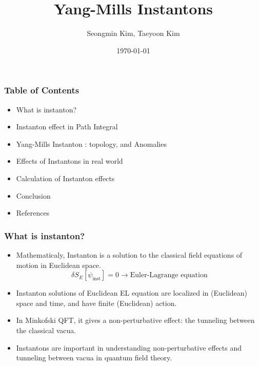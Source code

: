 \documentclass[10pt]{beamer}
\title{Yang-Mills Instantons}
\author{Seongmin Kim, Taeyoon Kim}
\institute{SNU}
\date{\today}
\begin{document}
\frame{\titlepage}

\begin{frame}
\frametitle{Table of Contents}
\begin{itemize}
\item What is instanton?
\item Instanton effect in Path Integral
\item Yang-Mills Instanton : topology, and Anomalies
\item Effects of Instantons in real world
\item Calculation of Instanton effects
\item Conclusion
\item References
\end{itemize}
\end{frame}

\begin{frame}
\frametitle{What is instanton?}
\begin{itemize}
\item Mathematicaly, Instanton is a solution to the classical field equations of motion in Euclidean space.
\begin{equation}
    \delta S_E [\psi_{\text{inst}}] = 0 \rightarrow \text{Euler-Lagrange equation}
\end{equation}
\item Instanton solutions of Euclidean EL equation are localized in (Euclidean) space and time, and have finite (Euclidean) action.
\item In Minkofski QFT, it gives a non-perturbative effect: the tunneling between the classical vacua.
\item Instantons are important in understanding non-perturbative effects and tunneling between vacua in quantum field theory.
\end{itemize}
\end{frame}
\end{document}
